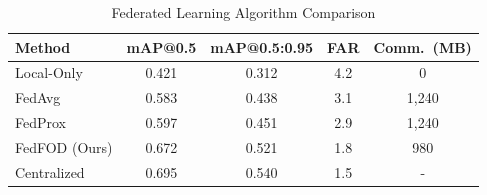 \begin{table}[t]
\centering
\caption{Federated Learning Algorithm Comparison}
\label{tab:fl_comparison}
\begin{tabular}{lcccc}
\toprule
Method & mAP@0.5 & mAP@0.5{:}0.95 & FAR & Comm.\ (MB) \\
\midrule
Local-Only & 0.421 & 0.312 & 4.2 & 0 \\
FedAvg & 0.583 & 0.438 & 3.1 & 1,240 \\
FedProx & 0.597 & 0.451 & 2.9 & 1,240 \\
FedFOD (Ours) & 0.672 & 0.521 & 1.8 & 980 \\
Centralized & 0.695 & 0.540 & 1.5 & - \\
\bottomrule
\end{tabular}
\end{table}